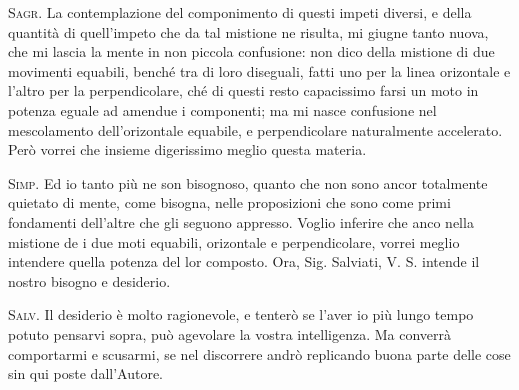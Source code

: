 \documentclass[11pt,twoside,openany]{book}
\newcommand{\speaker}[1]{\textcolor{rubric}{\textsc{#1}}\space}
\begin{document}
\speaker{Sagr.} La contemplazione del componimento di questi impeti diversi, e della quantità di quell'impeto che da tal mistione ne risulta, mi giugne tanto nuova, che mi lascia la mente in non piccola confusione: non dico della mistione di due movimenti equabili, benché tra di loro diseguali, fatti uno per la linea orizontale e l'altro per la perpendicolare, ché di questi resto capacissimo farsi un moto in potenza eguale ad amendue i componenti; ma mi nasce confusione nel mescolamento dell'orizontale equabile, e perpendicolare naturalmente accelerato. Però vorrei che insieme digerissimo meglio questa materia.

\speaker{Simp.} Ed io tanto più ne son bisognoso, quanto che non sono ancor totalmente quietato di mente, come bisogna, nelle proposizioni che sono come primi fondamenti dell'altre che gli seguono appresso. Voglio inferire che anco nella mistione de i due moti equabili, orizontale e perpendicolare, vorrei meglio intendere quella potenza del lor composto. Ora, Sig. Salviati, V. S. intende il nostro bisogno e desiderio.

\speaker{Salv.} Il desiderio è molto ragionevole, e tenterò se l'aver io più lungo tempo potuto pensarvi sopra, può agevolare la vostra intelligenza. Ma converrà comportarmi e scusarmi, se nel discorrere andrò replicando buona parte delle cose sin qui poste dall'Autore.
\end{document}
